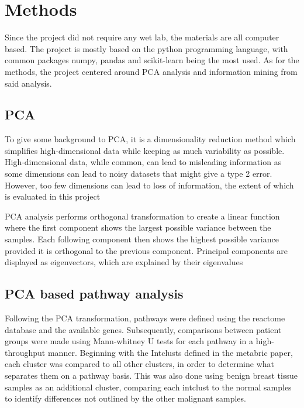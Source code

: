 \documentclass{kththesis}
\begin{document}
    \section{}


\chapter{Methods}

     Since the project did not require any wet lab, the materials are all computer based. The project is mostly based on the python programming language, with common packages numpy, pandas and scikit-learn being the most used. As for the methods, the project centered around PCA analysis and information mining from said analysis.

     
     \section{PCA}
     To give some background to PCA, it is a dimensionality reduction method which simplifies high-dimensional data while keeping as much variability as possible. High-dimensional data, while common, can lead to misleading information as some dimensions can lead to noisy datasets that might give a type 2 error. However, too few dimensions can lead to loss of information, the extent of which is evaluated in this project

     PCA analysis performs orthogonal transformation to create a linear function where the first component shows the largest possible variance between the samples. Each following component then shows the highest possible variance provided it is orthogonal to the previous component. Principal components are displayed as eigenvectors, which are explained by their eigenvalues


     \section{PCA based pathway analysis}
     Following the PCA transformation, pathways were defined using the reactome database and the available genes. Subsequently, comparisons between patient groups were made using Mann-whitney U tests for each pathway in a high-throughput manner. Beginning with the Intclusts defined in the metabric paper, each cluster was compared to all other clusters, in order to determine what separates them on a pathway basis. This was also done using benign breast tissue samples as an additional cluster, comparing each intclust to the normal samples to identify differences not outlined by the other malignant samples.
\end{document}
